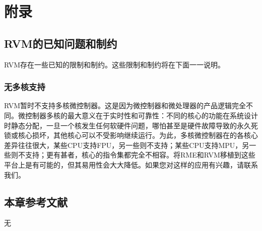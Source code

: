 \chapter{附录}\label{ch:9-appendix}

\section{RVM的已知问题和制约}\label{sec:9-1}

RVM存在一些已知的限制和制约。这些限制和制约将在下面一一说明。

\subsection{无多核支持}\label{subsec:9-1-1}

RVM暂时不支持多核微控制器。这是因为微控制器和微处理器的产品逻辑完全不同。微控制器多核的最大意义在于实时性和可靠性：不同的核心的功能在系统设计时静态分配，一旦一个核发生任何软硬件问题，哪怕甚至是硬件故障导致的永久死锁或核心损坏，其他核心可以不受影响继续运行。为此，多核微控制器在的各核心差异往往很大，某些CPU支持FPU，另一些则不支持；某些CPU支持MPU，另一些则不支持；更有甚者，核心的指令集都完全不相容。将RME和RVM移植到这些平台上是有可能的，但其易用性会大大降低。如果您对这样的应用有兴趣，请联系我们。

\section{本章参考文献}\label{sec:9-2}

无
